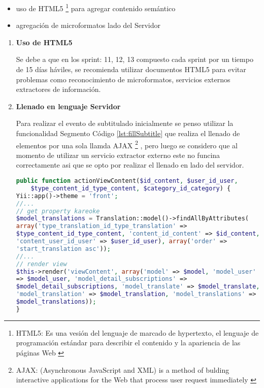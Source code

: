 \begin{itemize}

\item uso de HTML5 \footnote{HTML5: Es una vesi\'{o}n del lenguaje de marcado
de hypertexto, el lenguaje de programaci\'{o}n est\'{a}ndar para describir el
contenido y la apariencia de las p\'{a}ginas Web \cite{html5}}  para agregar 
contenido sem\'{a}ntico
\item agregaci\'{o}n de microformatos lado del Servidor

\end{itemize}

\begin{enumerate}

\item \textbf{Uso de HTML5}

Se debe a que en los sprint: 11, 12, 13 compuesto cada sprint por un tiempo de
15 d\'{i}as h\'{a}viles, se recomienda utilizar documentos HTML5 para evitar
problemas como reconocimiento de microformatos, servicios externos extractores
de informaci\'{o}n.

\item \textbf{Llenado en lenguaje Servidor}

Para realizar el evento de subtitulado inicialmente se penso utilizar la 
funcionalidad Segmento C\'{o}digo \ref{lst:fillSubtitle} que realiza el llenado
de elementos por una sola llamda AJAX \footnote{AJAX: (Asynchronous JavaScript
and XML) is a method of bulding interactive applications for the Web that 
process user request immediately \cite{ajax}} , pero luego se 
considero que al momento de utilizar un servicio extractor externo este no 
funcina correctamente asi que se opto por realizar el llenado en lado del 
servidor.

\begin{lstlisting}[language = PHP]
public function actionViewContent($id_content, $user_id_user, 
    $type_content_id_type_content, $category_id_category) {
Yii::app()->theme = 'front';
//...
// get property kareoke
$model_translations = Translation::model()->findAllByAttributes(
array('type_translation_id_type_translation' => 
$type_content_id_type_content, 'content_id_content' => $id_content,
'content_user_id_user' => $user_id_user), array('order' => 
'start_translation asc'));
//...
// render view
$this->render('viewContent', array('model' => $model, 'model_user'
=> $model_user, 'model_detail_subscriptions' => 
$model_detail_subscriptions, 'model_translate' => $model_translate,
'model_translation' => $model_translation, 'model_translations' => 
$model_translations));
}
\end{lstlisting}

\end{enumerate}

